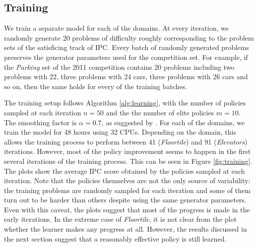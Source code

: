 \documentclass[letterpaper]{article} %
\begin{document}
\subsection{Training}

We train a separate model for each of the domains. At every iteration, we randomly generate 20 problems of difficulty roughly corresponding to the problem sets of the satisficing track of IPC. Every batch of randomly generated problems preserves the generator parameters used for the competition set. For example, if the \emph{Parking} set of the 2011 competition contains 20 problems including two problems with 22, three problems with 24 cars, three problems with 26 cars and so on, then the same holds for every of the training batches.

The training setup follows Algorithm \ref{alg:learning}, with the number of policies sampled at each iteration $n=50$ and the the number of elite policies $m=10$. The smoothing factor is $\alpha=0.7$, as suggested by \cite{Mannor2003}. For each of the domains, we train the model for 48 hours using 32 CPUs. Depending on the domain, this allows the training process to perform between 41 (\emph{Floortile}) and 91 (\emph{Elevators}) iterations. However, most of the policy improvement seems to happen in the first several iterations of the training process. This can be seen in Figure \ref{fig:training}. The plots show the average IPC score obtained by the policies sampled at each iteration. Note that the policies themselves are not the only source of variability: the training problems are randomly sampled for each iteration and some of them turn out to be harder than others despite using the same generator parameters. Even with this caveat, the plots suggest that most of the progress is made in the early iterations. In the extreme case of \emph{Floortile}, it is not clear from the plot whether the learner makes any progress at all. However, the results discussed in the next section suggest that a reasonably effective policy is still learned.
\end{document}

